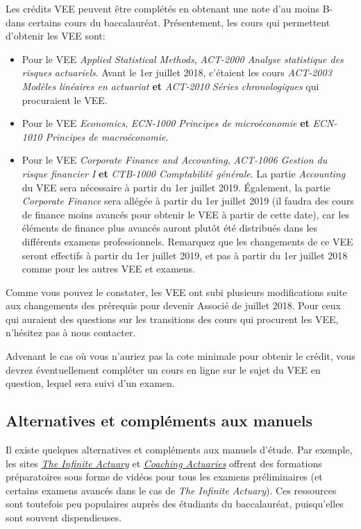 Les crédits VEE peuvent être complétés en obtenant une note d'au moins B- dans certains cours du baccalauréat. Présentement, les cours qui permettent d'obtenir les VEE sont:
\begin{itemize}
\item Pour le VEE \emph{Applied Statistical Methods}, \textit{ACT-2000 Analyse statistique des risques actuariels}. Avant le 1er juillet 2018, c'étaient les cours \textit{ACT-2003 Modèles linéaires en actuariat} \textbf{et} \textit{ACT-2010 Séries chronologiques} qui procuraient le VEE.
\item Pour le VEE \emph{Economics}, \textit{ECN-1000 Principes de microéconomie} \textbf{et} \textit{ECN-1010 Principes de macroéconomie}. 
\item Pour le VEE \emph{Corporate Finance and Accounting}, \textit{ACT-1006 Gestion du risque financier I} \textbf{et} \textit{CTB-1000 Comptabilité générale}. La partie \emph{Accounting} du VEE sera nécessaire à partir du 1er juillet 2019. Également, la partie \emph{Corporate Finance} sera allégée à partir du 1er juillet 2019 (il faudra des cours de finance moins avancés pour obtenir le VEE à partir de cette date), car les éléments de finance plus avancés auront plutôt été distribués dans les différents examens professionnels. Remarquez que les changements de ce VEE seront effectifs à partir du 1er juillet 2019, et pas à partir du 1er juillet 2018 comme pour les autres VEE et examens.
\end{itemize}
\vspace{\baselineskip}

Comme vous pouvez le constater, les VEE ont subi plusieurs modifications suite aux changements des prérequis pour devenir Associé de juillet 2018. Pour ceux qui auraient des questions sur les transitions des cours qui procurent les VEE, n'hésitez pas à nous contacter. \vspace{\baselineskip}

Advenant le cas où vous n'auriez pas la cote minimale pour obtenir le crédit, vous devrez éventuellement compléter un cours en ligne sur le sujet du VEE en question, lequel sera suivi d'un examen.

\newpage

\subsection*{Alternatives et compléments aux manuels}
\label{subsec:alternatives}
Il existe quelques alternatives et compléments aux manuels d'étude. Par exemple, les sites \href{http://www.theinfiniteactuary.com/}{\emph{The Infinite Actuary}} et \href{https://www.coachingactuaries.com/}{\emph{Coaching Actuaries}} offrent des formations préparatoires sous forme de vidéos pour tous les examens préliminaires (et certains examens avancés dans le cas de \emph{The Infinite Actuary}). Ces ressources sont toutefois peu populaires auprès des étudiants du baccalauréat, puisqu'elles sont souvent dispendieuses.\vspace{\baselineskip}

